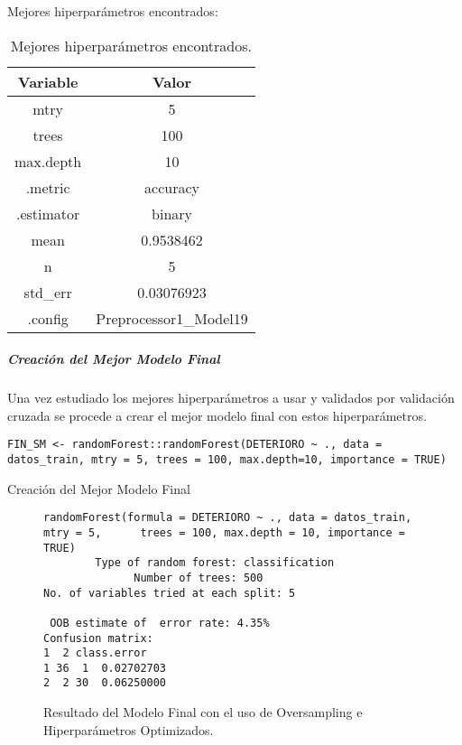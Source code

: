 Mejores hiperparámetros encontrados:

\begin{table}[H]
    \centering
    \begin{tabular}{|c|c|}
        \hline
        \textbf{Variable} & \textbf{Valor} \\
        \hline
        mtry & 5 \\
        trees & 100 \\
        max.depth & 10 \\
        .metric & accuracy \\
        .estimator & binary \\
        mean & 0.9538462 \\
        n & 5 \\
        std\_err & 0.03076923 \\
        .config & Preprocessor1\_Model19 \\
        \hline
    \end{tabular}
    \caption{Mejores hiperparámetros encontrados.}
    \label{tabla:mejores_hiperparametros}
\end{table}

\newpage
\subparagraph{Creación del Mejor Modelo Final}

Una vez estudiado los mejores hiperparámetros a usar y validados por validación cruzada se procede a crear el mejor modelo final con estos hiperparámetros.
\begin{code}[H]
\begin{lstlisting}[style=mystyle]
    FIN_SM <- randomForest::randomForest(DETERIORO ~ ., data = datos_train, mtry = 5, trees = 100, max.depth=10, importance = TRUE)
\end{lstlisting}
\caption{Creación del Mejor Modelo Final}
\label{code:Creación del Mejor Modelo Final}
\end{code}

\begin{figure}[H]
    \centering
    \begin{lstlisting}[frame=single, basicstyle=\small\ttfamily]
randomForest(formula = DETERIORO ~ ., data = datos_train, mtry = 5,      trees = 100, max.depth = 10, importance = TRUE) 
        Type of random forest: classification
              Number of trees: 500
No. of variables tried at each split: 5

 OOB estimate of  error rate: 4.35%
Confusion matrix:
1  2 class.error
1 36  1  0.02702703
2  2 30  0.06250000
    \end{lstlisting}
    \caption{Resultado del Modelo Final con el uso de Oversampling e Hiperparámetros Optimizados.}
    \label{fig:random_forest_FINAL_SMOTE_HIPER}
\end{figure}

